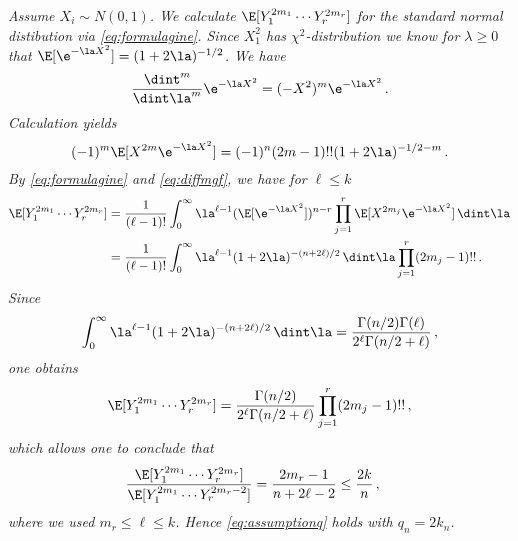 \begin{example}\label{ex:normal}{\em
Assume $X_i \sim N(0,1)$. We calculate $\E[Y_{1}^{2m_1}\cdots Y_{r}^{2m_r} ]$ for the standard normal distibution via \eqref{eq:formulagine}. Since $X_1^2$ has $\chi^2$-distribution we know for $\lambda\ge 0$ that $\E[\e^{-\la X^2}]=(1+2\la)^{-1/2}$.
We have 
\begin{equation*}
\frac{\dint^m}{\dint \la^m} \e^{-\la X^2} = (-X^2)^m \e^{-\la X^2}\,.
\end{equation*}
Calculation yields 
\begin{equation}\label{eq:diffmgf}
(-1)^{m} \E[X^{2m}\e^{-\la X^2} ]
=(-1)^n (2m-1)!! (1+2\la)^{-1/2-m}\,.
\end{equation}
By \eqref{eq:formulagine} and \eqref{eq:diffmgf}, we have for $\ell\le k$
\begin{equation*}
\begin{split}
\E[Y_{1}^{2m_1}\cdots Y_{r}^{2m_r} ] &= \frac{1}{(\ell-1)!} \int_0^{\infty} 
\la^{\ell-1} (\E[\e^{-\la X^2}])^{n-r}  \prod_{j=1}^r \E[X^{2m_j}\e^{-\la X^2} ] \, \dint \la\\
&= \frac{1}{(\ell-1)!} \int_0^{\infty} 
\la^{\ell-1} (1+2\la)^{-(n+2\ell)/2}  \, \dint \la \prod_{j=1}^r (2m_j-1)!!\,.
\end{split}
\end{equation*}
Since 
\begin{equation*}
\int_0^{\infty} 
\la^{\ell-1} (1+2\la)^{-(n+2\ell)/2}  \, \dint \la = \frac{\Gamma(n/2) \Gamma(\ell)}{2^{\ell} \Gamma(n/2+\ell)}\,,
\end{equation*}
one obtains
\begin{equation}\label{eq:momentsnormal}
\E[ Y_{1}^{2m_1}\cdots Y_{r}^{2m_r}] = \frac{\Gamma(n/2) }{2^\ell \Gamma(n/2+\ell)} \prod_{j=1}^r (2m_j-1)!!\,,
\end{equation}
which allows one to conclude that
\begin{equation*}
\begin{split}
\frac{\E[ Y_{1}^{2m_1}\cdots Y_{r}^{2m_r}]}{\E[ Y_{1}^{2m_1}\cdots Y_{r}^{2m_r-2}]}&=
\frac{2m_r-1}{n+2\ell-2}\le \frac{2k}{n}\,,
\end{split}
\end{equation*}
where we used $m_r\le \ell\le k$. Hence \eqref{eq:assumptionq} holds with $q_n=2k_n$.
}\end{example}

